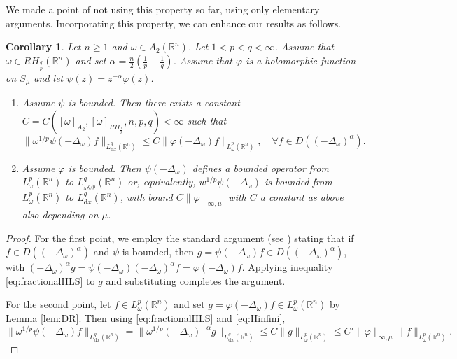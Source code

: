 \documentclass[12pt, letterpaper]{amsart}
\newtheorem{cor}[thm]{Corollary}
\theoremstyle{definition}
\theoremstyle{remark}
\numberwithin{equation}{section}
\begin{document}
{We made a point of not using this property so far, using only elementary arguments. Incorporating this property, we can enhance our results as follows.

\begin{cor} \label{cor:BHFC2}
Let $n\ge 1$ and $\omega \in A_2(\mathbb{R}^n)$.  Let $1<p<q<\infty$. Assume that $\omega \in RH_{\frac{q}{p}}(\mathbb{R}^n)$ and set $\alpha=\frac{n}{2}(\frac{1}{p}-\frac{1}{q})$. Assume that $\varphi$ is a holomorphic function on $S_{\mu}$ and let $\psi(z)= z^{-\alpha}\varphi(z)$.
\begin{enumerate}
    \item Assume $\psi$ is bounded. Then there exists a constant $C = C([ \omega  ]_{A_2},[ \omega  ]_{RH_{\frac{q}{p}}},n,p,q)<\infty$ such that
    \begin{equation*}
       \| \omega^{1/p}\psi(-\Delta_\omega) f \|_{L^q_{\mathrm{d}x}(\mathbb{R}^n)} \leq C \| \varphi(-\Delta_\omega) f \|_{L^p_{\omega}(\mathbb{R}^n)}, \quad \forall f \in D((-\Delta_\omega)^\alpha).
    \end{equation*}
    \item Assume $\varphi$ is bounded. Then $\psi(-\Delta_\omega)$ defines a bounded operator from $L^p_\omega(\mathbb{R}^n)$ to $L^q_{{\omega}^{q/p}}(\mathbb{R}^n)$ or, equivalently, $w^{1/p}\psi(-\Delta_\omega)$ is bounded from $L^p_\omega(\mathbb{R}^n)$ to $L^q_{\mathrm{d}x}(\mathbb{R}^n)$, 
with bound $C \|\varphi\|_{\infty, \mu}$ with $C$ a constant as above also depending on $\mu$. 
\end{enumerate}
\end{cor}

\begin{proof}
    
    {For the first point, we employ the standard argument (see \cite[Theorem 5.15]{egert2024harmonic}) stating that if $f \in D((-\Delta_\omega)^\alpha)$ and $\psi$ is bounded, then $g = \psi(-\Delta_\omega)f \in D((-\Delta_\omega)^\alpha)$, with $(-\Delta_\omega)^\alpha g = \psi(-\Delta_\omega)(-\Delta_\omega)^\alpha f = \varphi(-\Delta_\omega)f$. Applying inequality \eqref{eq:fractionalHLS} to $g$ and substituting completes the argument.}
    
    For the second point, let $f\in L^p_{\omega}(\mathbb{R}^n)$ and set $g=\varphi(-\Delta_\omega)f\in L^p_{\omega}(\mathbb{R}^n)$ by Lemma \ref{lem:DR}. Then using \eqref{eq:fractionalHLS} and \eqref{eq:Hinfini}, 
    \begin{equation*}
       \| \omega^{1/p}\psi(-\Delta_\omega) f \|_{L^q_{\mathrm{d}x}(\mathbb{R}^n)}=\| \omega^{1/p}(-\Delta_\omega)^{-\alpha} g \|_{L^q_{\mathrm{d}x}(\mathbb{R}^n)}  \leq C \| g \|_{L^p_{\omega}(\mathbb{R}^n)} \le C' \| \varphi \|_{\infty,\mu} \|  f \|_{L^p_{\omega}(\mathbb{R}^n)}.
    \end{equation*}
\end{proof}


}
\end{document}
